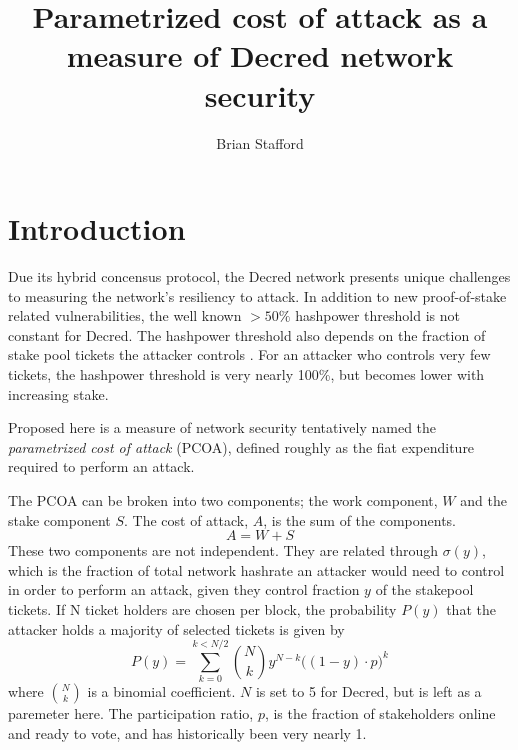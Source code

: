 \documentclass[a4paper,12pt]{article}
\begin{document}
\title{Parametrized cost of attack as a measure of Decred network security}
\author{Brian Stafford}
\maketitle

\section{Introduction}

Due its hybrid concensus protocol, the Decred network presents unique challenges to measuring the network's resiliency to attack. In addition to new proof-of-stake related vulnerabilities, the well known $ > 50\% $ hashpower threshold is not constant for Decred. The hashpower threshold also depends on the fraction of stake pool tickets the attacker controls \cite{POA}. For an attacker who controls very few tickets, the hashpower threshold is very nearly 100\%, but becomes lower with increasing stake. 

Proposed here is a measure of network security tentatively named the \emph{parametrized cost of attack} (PCOA), defined roughly as the fiat expenditure required to perform an attack.  

The PCOA can be broken into two components; the work component, $W$ and the stake component $S$. The cost of attack, $A$, is the sum of the components.
%
\begin{equation}
A = W + S
\end{equation}
%
These two components are not independent. They are related through $ \sigma(y) $, which is the fraction of total network hashrate an attacker would need to control in order to perform an attack, given they control fraction $ y $ of the stakepool tickets. If N ticket holders are chosen per block, the probability $ P(y) $ that the attacker holds a majority of selected tickets is given by 
%
\begin{equation}
P(y) = \sum_{k=0}^{k < N/2}  {{N}\choose{k}}   y^{N-k} \Big( (1-y) \cdot p \Big)^k
\end{equation}
%
where $ {{N}\choose{k}}  $ is a binomial coefficient. $ N $ is set to 5 for Decred, but is left as a paremeter here. The participation ratio, $ p $, is the fraction of stakeholders online and ready to vote, and has historically been very nearly 1. 
\end{document}
